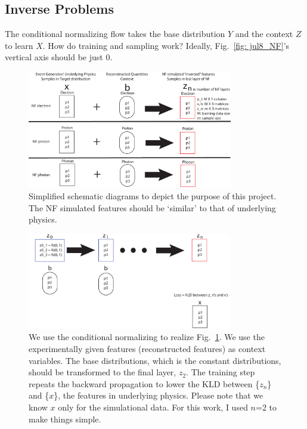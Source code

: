 \subsection{Inverse Problems}

    The conditional normalizing flow takes the base distribution $Y$ and the context $Z$ to learn $X$. How do training and sampling work? Ideally, Fig.~\ref{fig: jul8_NF}'s vertical axis should be just 0. 

    
    \begin{figure}[H]
        \centering
        \includegraphics[width=0.8\textwidth]{Chapters/Ch3-Simulations/normalizing_flows/pics/MeetingFigures/Sangbaek/NFdiag1.pdf}
        \caption[Placeholder Short text]{Simplified schematic diagrams to depict the purpose of this project. The NF simulated features should be `similar' to that of underlying physics.}
        \label{fig:goal}
    \end{figure}
    \begin{figure}[H]
        \centering
        \includegraphics[width=0.8\textwidth]{Chapters/Ch3-Simulations/normalizing_flows/pics/MeetingFigures/Sangbaek/NFdiag2.pdf}
        \caption[Placeholder Short text]{We use the conditional normalizing to realize Fig.~\ref{fig:goal}. We use the experimentally given features (reconstructed features) as context variables. The base distributions, which is the constant distributions, should be transformed to the final layer, $z_2$. The training step repeats the backward propagation to lower the KLD between \{$z_n$\} and \{$x$\}, the features in underlying physics. Please note that we know $x$ only for the simulational data. For this work, I used $n$=2 to make things simple.}
        \label{fig:architecture}
    \end{figure}
    
